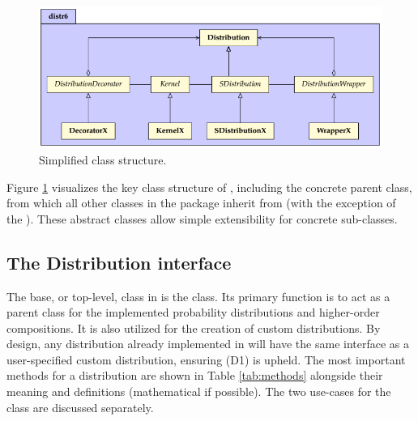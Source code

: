 \begin{figure}[h]
\centering
\includegraphics[scale=0.5]{images/uml_2}
\caption{Simplified  class structure.}
\label{fig:uml_2}
\end{figure}

Figure \ref{fig:uml_2} visualizes the key class structure of , including the concrete  parent class, from which all other classes in the package inherit from (with the exception of the ). These abstract classes allow simple extensibility for concrete sub-classes.

\subsection{The Distribution interface}
\label{sec:tools_distr6_api_distr}
The base, or top-level, class in  is the  class. Its primary function is to act as a parent class for the implemented probability distributions and higher-order compositions. It is also utilized for the creation of custom distributions. By design, any distribution already implemented in  will have the same interface as a user-specified custom distribution, ensuring (D1) is upheld. The most important methods for a distribution are shown in Table \ref{tab:methods} alongside their meaning and definitions (mathematical if possible). The two use-cases for the  class are discussed separately.

